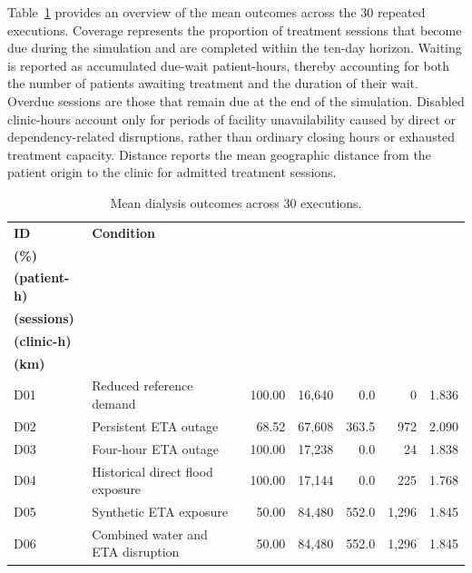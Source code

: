 Table~\ref{tbl:dialysis_results} provides an overview of the mean outcomes across the 30 repeated executions. Coverage represents the proportion of treatment sessions that become due during the simulation and are completed within the ten-day horizon. Waiting is reported as accumulated due-wait patient-hours, thereby accounting for both the number of patients awaiting treatment and the duration of their wait. Overdue sessions are those that remain due at the end of the simulation. Disabled clinic-hours account only for periods of facility unavailability caused by direct or dependency-related disruptions, rather than ordinary closing hours or exhausted treatment capacity. Distance reports the mean geographic distance from the patient origin to the clinic for admitted treatment sessions.

\begin{table}[ht]
\centering
\footnotesize
\setlength{\tabcolsep}{3pt}
\caption{Mean dialysis outcomes across 30 executions.}
\label{tbl:dialysis_results}
\begin{tabularx}{\linewidth}{
    @{}
    l
    >{\raggedright\arraybackslash}X
    rrrrr
    @{}
}
\toprule
\textbf{ID} &
\textbf{Condition} &
\shortstack{\textbf{Coverage}\\\textbf{(\%)}} &
\shortstack{\textbf{Wait}\\\textbf{(patient-h)}} &
\shortstack{\textbf{Overdue}\\\textbf{(sessions)}} &
\shortstack{\textbf{Disabled}\\\textbf{(clinic-h)}} &
\shortstack{\textbf{Distance}\\\textbf{(km)}} \\
\midrule

D01 & Reduced reference demand
    & 100.00 & 16,640 &   0.0 &     0 & 1.836 \\

D02 & Persistent ETA outage
    &  68.52 & 67,608 & 363.5 &   972 & 2.090 \\

D03 & Four-hour ETA outage
    & 100.00 & 17,238 &   0.0 &    24 & 1.838 \\

D04 & Historical direct flood exposure
    & 100.00 & 17,144 &   0.0 &   225 & 1.768 \\

D05 & Synthetic ETA exposure
    &  50.00 & 84,480 & 552.0 & 1,296 & 1.845 \\

D06 & Combined water and ETA disruption
    &  50.00 & 84,480 & 552.0 & 1,296 & 1.845 \\


\end{tabularx}
\end{table}
